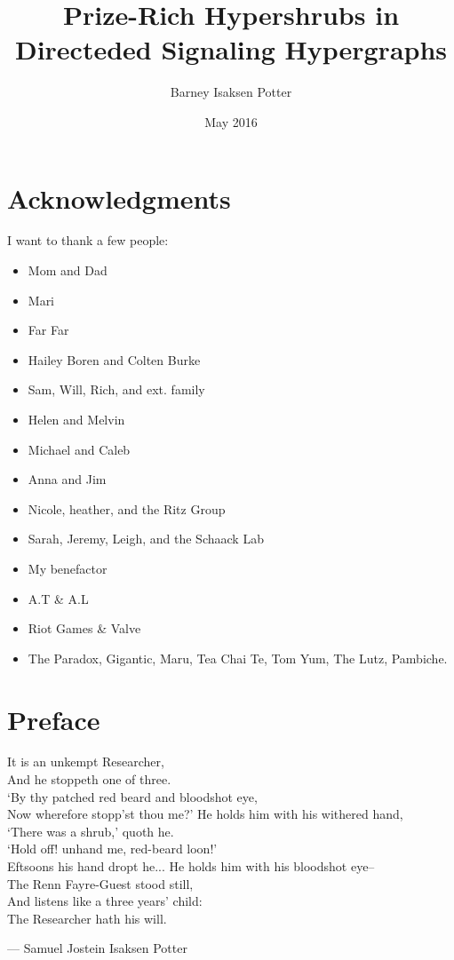 \documentclass[12pt,twoside]{reedthesis}
\title{Prize-Rich Hypershrubs in Directeded Signaling Hypergraphs}
\author{Barney Isaksen Potter}
\date{May 2016}
\theoremstyle{definition}
\begin{document}
  \maketitle
  \frontmatter %
  \pagestyle{empty} %

    \chapter*{Acknowledgments}
	I want to thank a few people:

  \begin{itemize}
    \item{Mom and Dad}
    \item{Mari}
    \item{Far Far}
    \item{Hailey Boren and Colten Burke}
    \item{Sam, Will, Rich, and ext. family}
    \item{Helen and Melvin}
    \item{Michael and Caleb}
    \item{Anna and Jim}
    \item{Nicole, heather, and the Ritz Group}
    \item{Sarah, Jeremy, Leigh, and the Schaack Lab}
    \item{My benefactor}
    \item{A.T \& A.L} %
    \item{Riot Games \& Valve}
    \item{The Paradox, Gigantic, Maru, Tea Chai Te, Tom Yum, The Lutz, Pambiche.}
  \end{itemize}

    \chapter*{Preface}
  \begin{center}
\epigraph{
   It is an unkempt Researcher, \\
  And he stoppeth one of three. \\
  `By thy patched red beard and bloodshot eye, \\
  Now wherefore stopp'st thou me?'
  \bigbreak
  He holds him with his withered hand, \\
  `There was a shrub,' quoth he. \\
  `Hold off! unhand me, red-beard loon!' \\
  Eftsoons his hand dropt he...
  \bigbreak
  He holds him with his bloodshot eye--\\
  The Renn Fayre-Guest stood still, \\
  And listens like a three years' child: \\
  The Researcher hath his will.}{--- \textup{Samuel Jostein Isaksen Potter}}%
\end{center}
\end{document}
